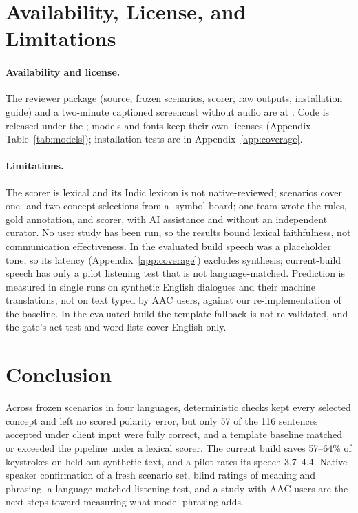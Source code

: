 \section{Availability, License, and Limitations}
\label{sec:limits}

\paragraph{Availability and license.}
The reviewer package (source, frozen scenarios, scorer, raw outputs, installation guide) and a two-minute captioned screencast without audio are at \demourl{}.
Code is released under the \codelicense{}; models and fonts keep their own licenses (Appendix Table~\ref{tab:models}); installation tests are in Appendix~\ref{app:coverage}.

\paragraph{Limitations.}
The scorer is lexical and its Indic lexicon is not native-reviewed; scenarios cover one- and two-concept selections from a \NSymbols{}-symbol board; one team wrote the rules, gold annotation, and scorer, with AI assistance and without an independent curator.
No user study has been run, so the results bound lexical faithfulness, not communication effectiveness.
In the evaluated build speech was a placeholder tone, so its latency (Appendix~\ref{app:coverage}) excludes synthesis; current-build speech has only a pilot listening test that is not language-matched.
Prediction is measured in single runs on synthetic English dialogues and their machine translations, not on text typed by AAC users, against our re-implementation of the baseline.
In the evaluated build the template fallback is not re-validated, and the gate's act test and word lists cover English only.

\section{Conclusion}
\label{sec:conclusion}

Across \NPrimAll{} frozen scenarios in four languages, deterministic checks kept every selected concept and left no scored polarity error, but only 57 of the 116 sentences accepted under client input were fully correct, and a template baseline matched or exceeded the pipeline under a lexical scorer.
The current build saves 57--64\% of keystrokes on held-out synthetic text, and a pilot rates its speech 3.7--4.4.
Native-speaker confirmation of a fresh scenario set, blind ratings of meaning and phrasing, a language-matched listening test, and a study with AAC users are the next steps toward measuring what model phrasing adds.
